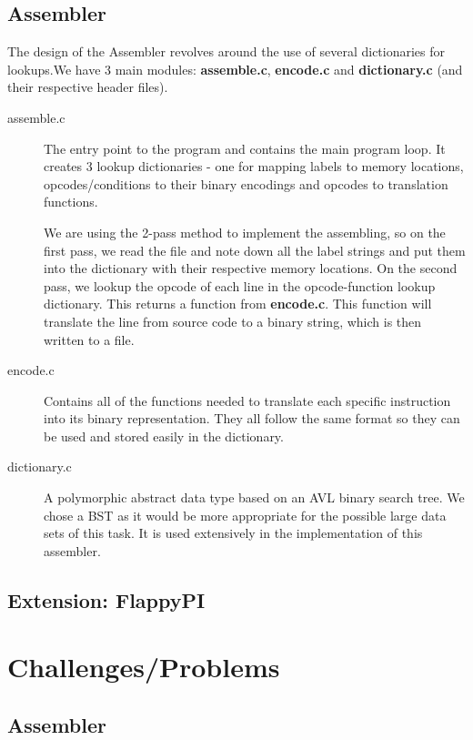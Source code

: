 \documentclass[11pt]{article}
\begin{document}
\subsection{Assembler}
The design of the Assembler revolves around the use of several dictionaries for lookups.We have 3 main modules: \textbf{assemble.c}, \textbf{encode.c} and \textbf{dictionary.c} (and their respective header files).

\begin{description}
\item[assemble.c]
The entry point to the program and contains the main program loop. It creates 3 lookup dictionaries - one for mapping labels to memory locations, opcodes/conditions to their binary encodings and opcodes to translation functions. 

We are using the 2-pass method to implement the assembling, so on the first pass, we read the file and note down all the label strings and put them into the dictionary with their respective memory locations. On the second pass, we lookup the opcode of each line in the opcode-function lookup dictionary. This returns a function from \textbf{encode.c}. This function will translate the line from source code to a binary string, which is then written to a file.

\item[encode.c]
Contains all of the functions needed to translate each specific instruction into its binary representation. They all follow the same format so they can be used and stored easily in the dictionary.

\item[dictionary.c]
A polymorphic abstract data type based on an AVL binary search tree. We chose a BST as it would be more appropriate for the possible large data sets of this task. It is used extensively in the implementation of this assembler.

\end{description}

\subsection{Extension: FlappyPI}


\section{Challenges/Problems}

\subsection{Assembler}
\end{document}

